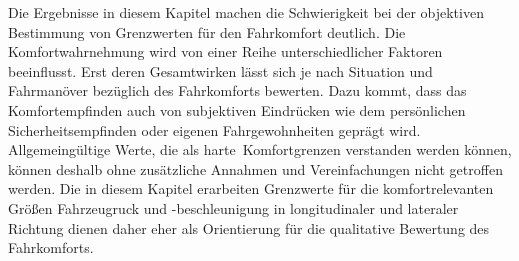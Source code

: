 Die Ergebnisse in diesem Kapitel machen die Schwierigkeit bei der objektiven Bestimmung von Grenzwerten für den Fahrkomfort deutlich. Die Komfortwahrnehmung wird von einer Reihe unterschiedlicher Faktoren beeinflusst. Erst deren Gesamtwirken lässt sich je nach Situation und Fahrmanöver bezüglich des Fahrkomforts bewerten. Dazu kommt, dass das Komfortempfinden auch von subjektiven Eindrücken wie dem persönlichen Sicherheitsempfinden oder eigenen Fahrgewohnheiten geprägt wird. Allgemeingültige Werte, die als \glqq harte\grqq~Komfortgrenzen verstanden werden können, können deshalb ohne zusätzliche Annahmen und Vereinfachungen nicht getroffen werden. Die in diesem Kapitel erarbeiten Grenzwerte für die komfortrelevanten Größen Fahrzeugruck und -beschleunigung in longitudinaler und lateraler Richtung dienen daher eher als Orientierung für die qualitative Bewertung des Fahrkomforts.

